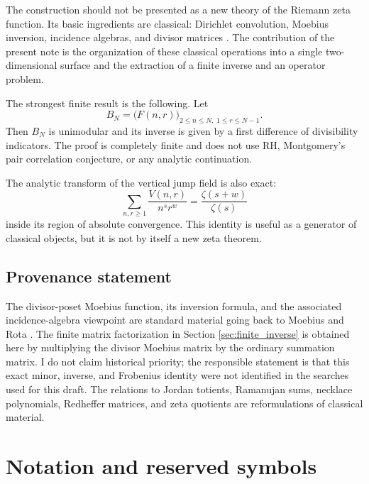 \documentclass[11pt]{amsart}
\numberwithin{equation}{section}
\theoremstyle{plain}
\theoremstyle{definition}
\theoremstyle{remark}
\newcommand{\zetaR}{\zeta}
\newcommand{\Fsurf}{F}
\newcommand{\Vjump}{V}
\begin{document}
The construction should not be presented as a new theory of the Riemann zeta function.  Its basic ingredients are classical: Dirichlet convolution, Moebius inversion, incidence algebras, and divisor matrices \cite{Mobius1832,Rota1964,Stanley2012}.  The contribution of the present note is the organization of these classical operations into a single two-dimensional surface and the extraction of a finite inverse and an operator problem.

The strongest finite result is the following.  Let
\begin{equation}
B_N=\bigl(\Fsurf(n,r)\bigr)_{2\le n\le N,\;1\le r\le N-1}.
\label{eq:intro_BN}
\end{equation}
Then \(B_N\) is unimodular and its inverse is given by a first difference of divisibility indicators.  The proof is completely finite and does not use RH, Montgomery's pair correlation conjecture, or any analytic continuation.

The analytic transform of the vertical jump field is also exact:
\begin{equation}
\sum_{n,r\ge1}\frac{\Vjump(n,r)}{n^s r^w}=\frac{\zetaR(s+w)}{\zetaR(s)}
\label{eq:intro_jump_transform}
\end{equation}
inside its region of absolute convergence.  This identity is useful as a generator of classical objects, but it is not by itself a new zeta theorem.

\subsection*{Provenance statement}
\label{subsec:provenance_statement}
The divisor-poset Moebius function, its inversion formula, and the associated incidence-algebra viewpoint are standard material going back to Moebius and Rota \cite{Mobius1832,Rota1964}.  The finite matrix factorization in Section \ref{sec:finite_inverse} is obtained here by multiplying the divisor Moebius matrix by the ordinary summation matrix.  I do not claim historical priority; the responsible statement is that this exact minor, inverse, and Frobenius identity were not identified in the searches used for this draft.  The relations to Jordan totients, Ramanujan sums, necklace polynomials, Redheffer matrices, and zeta quotients are reformulations of classical material.

\section{Notation and reserved symbols}
\label{sec:notation}
\end{document}
